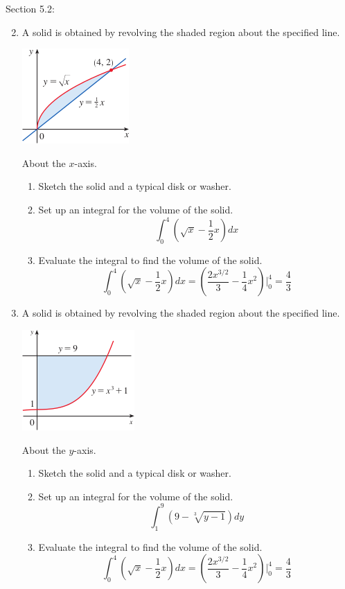 \documentclass[12pt]{article}
\begin{document}
Section 5.2:

\begin{enumerate}
\setcounter{enumi}{1}
    \item A solid is obtained by revolving the shaded region about the specified line.
    \begin{center}
        \includegraphics{img/img-2.png}
    \end{center}
    About the $x$-axis.
    \begin{enumerate}
        \item Sketch the solid and a typical disk or washer.
        \item Set up an integral for the volume of the solid.
        \[\int_{0}^{4}(\sqrt{x} - \frac{1}{2}x)dx \]
        \item Evaluate the integral to find the volume of the solid.
        \[\int_{0}^{4}(\sqrt{x} - \frac{1}{2}x)dx = (\frac{2x^{3/2}}{3} - \frac{1}{4}x^2)|_0^4 = \frac{4}{3}\]
    \end{enumerate}
    \item A solid is obtained by revolving the shaded region about the specified line.
    \begin{center}
        \includegraphics{img/img-3.png}
    \end{center}
    About the $y$-axis.
    \begin{enumerate}
        \item Sketch the solid and a typical disk or washer.
        \item Set up an integral for the volume of the solid.
        \[\int_{1}^{9} (9 - \sqrt[3]{y-1})dy \]
        \item Evaluate the integral to find the volume of the solid.
        \[\int_{0}^{4}(\sqrt{x} - \frac{1}{2}x)dx = (\frac{2x^{3/2}}{3} - \frac{1}{4}x^2)|_0^4 = \frac{4}{3}\]
    \end{enumerate}
\end{enumerate}
\end{document}
